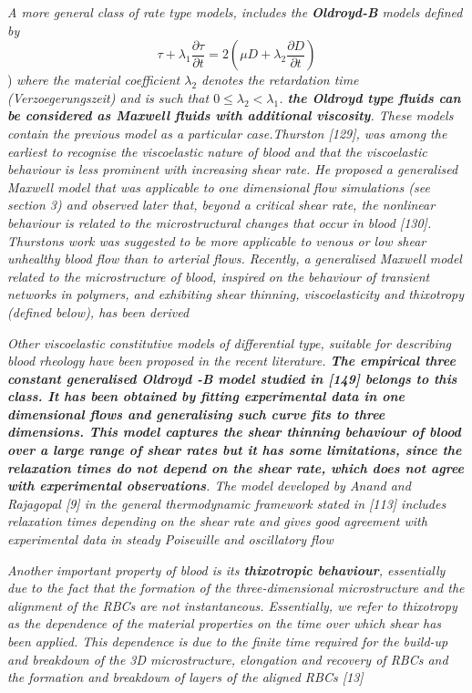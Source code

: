 \documentclass[11pt,letterpaper]{article}
\begin{document}
\textit{A more general class of rate type models, includes the {\color{red}\textbf{Oldroyd-B}} models defined by}
\begin{equation}
     \tau + \lambda_1\frac{\partial \tau}{\partial t} = 2(\mu D+\lambda_2\frac{\partial D}{\partial t})
\end{equation})
\textit{where the material coefficient $\lambda_2$ denotes the retardation time (Verzoegerungszeit) and is such that  $0 \leq \lambda_2 < \lambda_1$. \textbf{the Oldroyd type fluids can be considered as Maxwell fluids with additional viscosity}. These models contain the previous model as a particular case.Thurston [129], was among the earliest to recognise the viscoelastic nature of blood and that the viscoelastic behaviour is less prominent with increasing shear rate. He proposed a generalised Maxwell model that was applicable to one dimensional flow simulations (see section 3) and observed later that, beyond a critical shear rate, the nonlinear behaviour is related to the microstructural changes that occur in blood [130]. Thurstons work was suggested to be more applicable to venous or low shear unhealthy blood flow than to arterial flows. Recently, a generalised Maxwell model related to the microstructure of blood, inspired on the behaviour of transient networks in polymers, and exhibiting shear thinning, viscoelasticity and thixotropy (defined below), has been derived }

\textit{Other viscoelastic constitutive models of differential type, suitable for describing blood rheology have been proposed in the recent literature. \textbf{The empirical three constant generalised Oldroyd -B model studied in [149] belongs to this class. It has been obtained by fitting experimental data in one dimensional flows and generalising such curve fits to three dimensions. This model captures the shear thinning behaviour of blood over a large range of shear rates but it has some limitations, since the relaxation times do not depend on the shear rate, which does not agree with experimental observations}. {\color{blue}The model developed by Anand and Rajagopal [9] in the general thermodynamic framework stated in [113] includes relaxation times depending on the shear rate and gives good agreement with experimental data in steady Poiseuille and oscillatory flow}}

\textit{Another important property of blood is its \textbf{thixotropic behaviour}, essentially due to the fact that the formation of the three-dimensional microstructure and the alignment of the RBCs are not instantaneous. Essentially, we refer to thixotropy as the dependence of the material properties on the time over which shear has been applied. This dependence is due to the finite time required for the build-up and breakdown of the 3D microstructure, elongation and recovery of RBCs and the formation and breakdown of layers of the aligned RBCs [13]}
\end{document}
